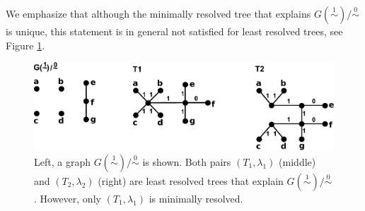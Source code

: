 \documentclass[smallextended]{svjour3}
\newcommand{\rev}[1]{\begingroup\color{blue}#1\endgroup}
\newcommand{\remove}[1]{\begingroup\tiny\color{yellow}#1\endgroup}
\newcommand{\Ro}{\mathrel{\overset{0}{\sim}}}
\newcommand{\Rl}{\mathrel{\overset{1}{\sim}}}
\begin{document}
\rev{
We emphasize that although the minimally resolved tree that explains 
 $G(\Rl)/\Ro$ is unique, this statement is in general not satisfied for
least resolved trees, see Figure \ref{fig:nonU-LRT}.
 }

\begin{figure}[htbp]
\begin{center}
\includegraphics[width=1\textwidth]{./nonUniqueLRT.pdf}
\end{center}
\caption{Left, a graph  $G(\Rl)/\Ro$ is shown. Both pairs $(T_1,\lambda_1)$ (middle)
		and $(T_2,\lambda_2)$ (right) are least resolved trees that explain  $G(\Rl)/\Ro$. 
		However, only  $(T_1,\lambda_1)$ is minimally resolved. }
\label{fig:nonU-LRT}
\end{figure}





\end{document}
